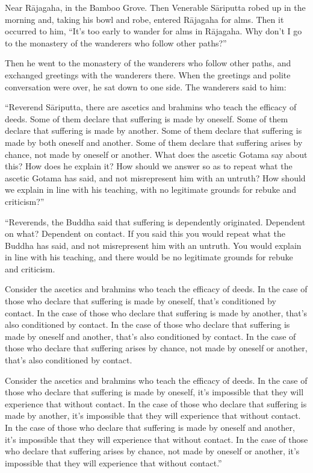\documentclass[12pt,openany]{book}%
\begin{document}
Near \textsanskrit{Rājagaha}, in the Bamboo Grove. Then Venerable \textsanskrit{Sāriputta} robed up in the morning and, taking his bowl and robe, entered \textsanskrit{Rājagaha} for alms. Then it occurred to him, “It’s too early to wander for alms in \textsanskrit{Rājagaha}. Why don’t I go to the monastery of the wanderers who follow other paths?” 

Then he went to the monastery of the wanderers who follow other paths, and exchanged greetings with the wanderers there. When the greetings and polite conversation were over, he sat down to one side. The wanderers said to him: 

“Reverend \textsanskrit{Sāriputta}, there are ascetics and brahmins who teach the efficacy of deeds. Some of them declare that suffering is made by oneself. Some of them declare that suffering is made by another. Some of them declare that suffering is made by both oneself and another. Some of them declare that suffering arises by chance, not made by oneself or another. What does the ascetic Gotama say about this? How does he explain it? How should we answer so as to repeat what the ascetic Gotama has said, and not misrepresent him with an untruth? How should we explain in line with his teaching, with no legitimate grounds for rebuke and criticism?” 

“Reverends, the Buddha said that suffering is dependently originated. Dependent on what? Dependent on contact. If you said this you would repeat what the Buddha has said, and not misrepresent him with an untruth. You would explain in line with his teaching, and there would be no legitimate grounds for rebuke and criticism. 

Consider the ascetics and brahmins who teach the efficacy of deeds. In the case of those who declare that suffering is made by oneself, that’s conditioned by contact. In the case of those who declare that suffering is made by another, that’s also conditioned by contact. In the case of those who declare that suffering is made by oneself and another, that’s also conditioned by contact. In the case of those who declare that suffering arises by chance, not made by oneself or another, that’s also conditioned by contact. 

Consider the ascetics and brahmins who teach the efficacy of deeds. In the case of those who declare that suffering is made by oneself, it’s impossible that they will experience that without contact. In the case of those who declare that suffering is made by another, it’s impossible that they will experience that without contact. In the case of those who declare that suffering is made by oneself and another, it’s impossible that they will experience that without contact. In the case of those who declare that suffering arises by chance, not made by oneself or another, it’s impossible that they will experience that without contact.” 
\end{document}
